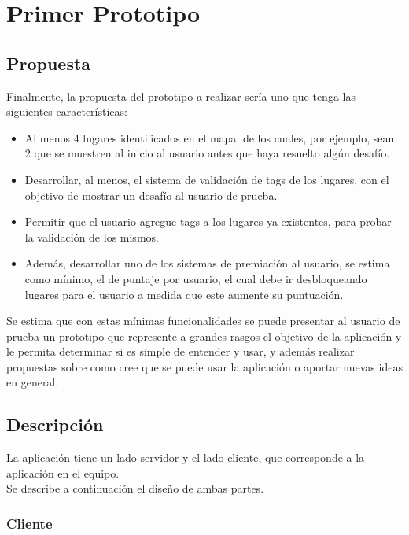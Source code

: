 \documentclass[10pt,letterpaper]{article}
\begin{document}
\newpage
\section{Primer Prototipo}

\subsection{Propuesta}

Finalmente, la propuesta del prototipo a realizar sería uno que tenga las siguientes características:

\begin{itemize}
\item Al menos 4 lugares identificados en el mapa, de los cuales, por ejemplo, sean 2 que se muestren al inicio al usuario antes que haya resuelto algún desafío.

\item Desarrollar, al menos, el sistema de validación de tags de los lugares, con el objetivo de mostrar un desafío al usuario de prueba.

\item Permitir que el usuario agregue tags a los lugares ya existentes, para probar la validación de los mismos.

\item Además, desarrollar uno de los sistemas de premiación al usuario, se estima como mínimo, el de puntaje por usuario, el cual debe ir desbloqueando lugares para el usuario a medida que este aumente su puntuación.
\end{itemize}

Se estima que con estas mínimas funcionalidades se puede presentar al usuario de prueba un prototipo que represente a grandes rasgos el objetivo de la aplicación y le permita determinar si es simple de entender y usar, y además realizar propuestas sobre como cree que se puede usar la aplicación o aportar nuevas ideas en general.


\subsection{Descripción}

La aplicación tiene un lado servidor y el lado cliente, que corresponde a la aplicación en el equipo.\\

Se describe a continuación el diseño de ambas partes.

\subsubsection{Cliente}
\end{document}
